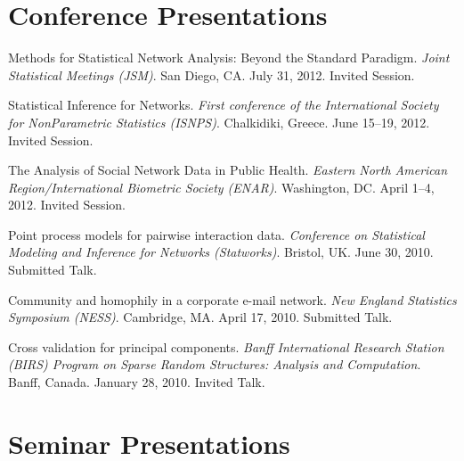 \documentclass[10pt,letterpaper]{article}
\renewenvironment{itemize}{
  \begin{list}{}{
    \setlength{\leftmargin}{1.5em}
    \setlength{\itemsep}{0.25em}
    \setlength{\parskip}{0pt}
    \setlength{\parsep}{0.25em}
  }
}{
  \end{list}
}
\begin{document}
\section*{Conference Presentations}
\begin{itemize}
\item Methods for Statistical Network Analysis: Beyond the Standard Paradigm.
  \textit{Joint Statistical Meetings (JSM)}.
  San Diego, CA.
  July 31, 2012.
  Invited Session.

\item Statistical Inference for Networks. 
  \textit{First conference of the International Society for NonParametric Statistics (ISNPS)}.
  Chalkidiki, Greece.
  June 15--19, 2012.
  Invited Session.

\item The Analysis of Social Network Data in Public Health.
  \textit{Eastern North American Region/International Biometric Society (ENAR)}.
  Washington, DC.
  April 1--4, 2012.
  Invited Session.

\item Point process models for pairwise interaction data.
  \textit{Conference on Statistical Modeling and Inference for Networks (Statworks)}.
  Bristol, UK.
  June 30, 2010.
  Submitted Talk.

\item Community and homophily in a corporate e-mail network.
  \textit{New England Statistics Symposium (NESS)}.
  Cambridge, MA.
  April 17, 2010.
  Submitted Talk.

\item Cross validation for principal components.
  \textit{Banff International Research Station (BIRS) Program on Sparse Random Structures: Analysis and Computation}.
  Banff, Canada.
  January 28, 2010.
  Invited Talk.
\end{itemize}


\section*{Seminar Presentations}
\end{document}
